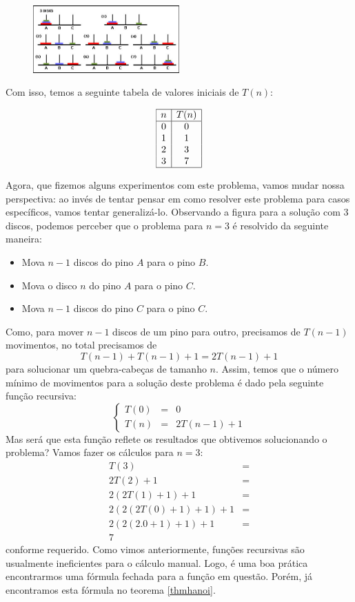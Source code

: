 \begin{figure}[h!]
  \centering
      \includegraphics[width=0.5\textwidth]{imagens/hanoi3.jpg}
 \end{figure}

Com isso, temos a seguinte tabela de valores iniciais de $T(n)$:

\[
\begin{array}{|c|c|}
  \hline
  n & T(n)\\ \hline
  0  & 0 \\
  1  & 1 \\
  2 & 3 \\
  3 & 7\\
  \hline
\end{array}
\]

Agora, que fizemos alguns experimentos com este problema, vamos mudar
nossa perspectiva: ao invés de tentar pensar em como resolver este
problema para casos específicos, vamos tentar
generalizá-lo. Observando a figura para a solução com 3 discos,
podemos perceber que o problema para $n = 3$ é resolvido da seguinte
maneira:
\begin{itemize}
  \item Mova $n - 1$ discos do pino $A$ para o pino $B$.
  \item Mova o disco $n$ do pino $A$ para o pino $C$.
  \item Mova $n - 1$ discos do pino $C$ para o pino $C$.
\end{itemize}
Como, para mover $n - 1$ discos de um pino para outro, precisamos de $T(n
-1)$ movimentos, no total precisamos de
\[
T(n - 1) + T(n - 1) + 1 = 2T(n - 1) + 1
\]
para solucionar um quebra-cabeças de tamanho $n$. Assim, temos que o
número mínimo de movimentos para a solução deste problema é dado pela
seguinte função recursiva:
\[
\left\{
\begin{array}{lcl}
T(0) & = & 0 \\
T(n) & = & 2 T(n - 1) + 1
\end{array}
\right.
\]
Mas será que esta função reflete os resultados que obtivemos
solucionando o problema? Vamos fazer os cálculos para $n = 3$:
\[
\begin{array}{lc}
T(3) & = \\
2 T(2) + 1 & = \\
2(2T(1) + 1) + 1 & =\\
2(2(2T(0) + 1) + 1) + 1 & = \\
2(2(2.0 + 1) + 1) + 1 & = \\
7
\end{array}
\]
conforme requerido. Como vimos anteriormente, funções recursivas são
usualmente ineficientes para o cálculo manual. Logo, é uma boa prática
encontrarmos uma fórmula fechada para a função em questão. Porém, já
encontramos esta fórmula no teorema \ref{thmhanoi}.


